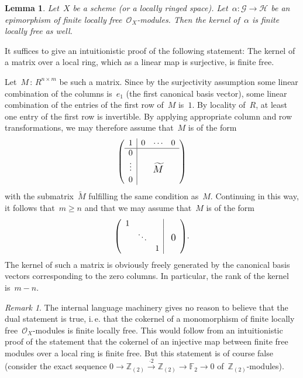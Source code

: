 \documentclass[10pt,reqno,a4paper]{amsbook}
\makeatletter
\theoremstyle{definition}
\theoremstyle{plain}
\newtheorem{lemma}[defn]{Lemma}
\theoremstyle{remark}
\newtheorem{rem}[defn]{Remark}
\newcommand{\ZZ}{\mathbb{Z}}
\newcommand{\FF}{\mathbb{F}}
\newcommand{\G}{\mathcal{G}}
\renewcommand{\H}{\mathcal{H}}
\renewcommand{\O}{\mathcal{O}}
\newcommand{\?}{\,{:}\,}
\renewcommand{\_}{\mathpunct{.}\,}
\newcommand{\lra}{\longrightarrow}
\newcommand{\ie}{i.\,e.\@\xspace}
\renewenvironment{proof}[1][\proofname]{\par
  \pushQED{\qed}%
  \normalfont \topsep6\p@\@plus6\p@\relax
  \trivlist
  \item[\hskip\labelsep
        \itshape
    #1\@addpunct{.}]\ignorespaces
}{%
  \popQED\endtrivlist\@endpefalse
}
\makeatother
\begin{document}
\begin{lemma}\label{lemma:kernel-of-epi-fingen}
Let~$X$ be a scheme (or a locally ringed space). Let~$\alpha : \G
\to \H$ be an epimorphism of finite locally free~$\O_X$-modules. Then the
kernel of~$\alpha$ is finite locally free as well.\end{lemma}
\begin{proof}It suffices to give an intuitionistic proof of the following
statement: The kernel of a matrix over a local ring, which as a linear map is
surjective, is finite free.

Let~$M \? R^{n \times m}$ be such a matrix. Since by the surjectivity
assumption some linear combination of the columns is~$e_1$ (the first canonical
basis vector), some linear combination of the entries of the first row of~$M$
is~$1$. By locality of~$R$, at least one entry of the first row is invertible.
By applying appropriate column and row transformations, we may therefore assume that~$M$
is of the form
\[ \left(
  \begin{array}{c|ccc}
    1 & 0 & \cdots & 0 \\ \hline
    0 & \multicolumn{3}{c}{\multirow{3}{*}{\raisebox{-5mm}{\scalebox{1.2}{$\widetilde M$}}}} \\
    \raisebox{2pt}{\vdots} & & & \\
    0 & & &
  \end{array}
\right) \]
with the submatrix~$\widetilde M$ fulfilling the same condition as~$M$.
Continuing in this way, it follows that~$m \geq n$ and that we may assume
that~$M$ is of the form
\[ \left(
  \begin{array}{ccc|c}
    1 & & & \multirow{3}{*}{\raisebox{-3mm}{\scalebox{1.2}{\ 0}}} \\
    & \ddots && \\
    && 1
  \end{array}
\right)\!. \]
The kernel of such a matrix is obviously freely generated by the canonical
basis vectors corresponding to the zero columns. In particular, the rank of the
kernel is~$m-n$.
\end{proof}

\begin{rem}The internal language machinery gives no reason to believe that the
dual statement is true, \ie that the cokernel of a monomorphism of finite
locally free~$\O_X$-modules is finite locally free. This would follow from
an intuitionistic proof of the statement that the cokernel of an injective map
between finite free modules over a local ring is finite free. But this
statement is of course false (consider the exact sequence
$0 \lra \ZZ_{(2)} \stackrel{\cdot 2}{\lra} \ZZ_{(2)} \lra \FF_2 \lra 0$
of~$\ZZ_{(2)}$-modules).
\end{rem}
\end{document}
